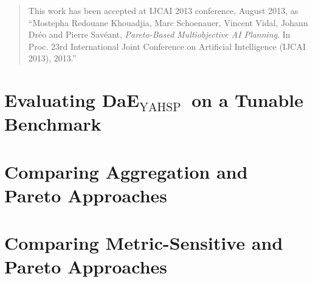\documentclass[english]{DESCARWINreport}
\newcounter{con}
\newcommand{\DAEYAHSP}{{\sc DaE$_{\text{YAHSP}}$}}
\begin{document}
\begin{abstract}
\begin{itemize}
This work has been accepted at IJCAI 2013 conference, August 2013, as ``Mostepha Redouane Khouadjia, Marc Schoenauer, Vincent Vidal, Johann Dréo and Pierre Savéant, {\em Pareto-Based Multiobjective AI Planning}. In Proc. 23rd International Joint Conference on Artificial Intelligence (IJCAI 2013), 2013.''
\end{itemize}



\end{abstract}


\tableofcontents

\newpage

\chapter{Evaluating \DAEYAHSP\ on a Tunable Benchmark}



\newpage
\hoffset 0cm

\newpage
\hoffset -2cm

\chapter{Comparing Aggregation and Pareto Approaches}

\newpage
\hoffset 0cm

\newpage
\hoffset -2cm

\chapter{Comparing Metric-Sensitive and Pareto Approaches}

\newpage
\hoffset 0cm

\hoffset -2cm
\end{document}
